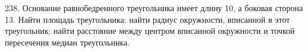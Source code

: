 238. Основание равнобедренного треугольника имеет длину 10, а боковая сторона 13. Найти площадь треугольника; найти радиус окружности, вписанной в этот треугольник; найти расстояние между центром вписанной окружности и точкой пересечения медиан треугольника.\\
